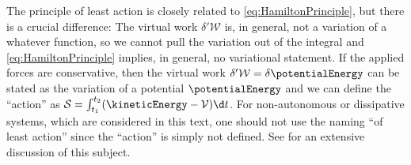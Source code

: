 The principle of least action is closely related to \eqref{eq:HamiltonPrinciple}, but there is a crucial difference:
The virtual work $\delta'\mathcal{W}$ is, in general, not a variation of a whatever function, so we cannot pull the variation out of the integral and \eqref{eq:HamiltonPrinciple} implies, in general, no variational statement.
If the applied forces are conservative, then the virtual work $\delta'\mathcal{W} = \delta\potentialEnergy$ can be stated as the variation of a potential $\potentialEnergy$ and we can define the ``action'' as $\mathcal{S} = \int_{t_1}^{t_2} (\kineticEnergy - \mathcal{V}) \d t$.
For non-autonomous or dissipative systems, which are considered in this text, one should not use the naming ``of least action'' since the ``action'' is simply not defined.
See \cite[sec.\ 12.2]{Lurie:AnalyticalMechanics} for an extensive discussion of this subject.
